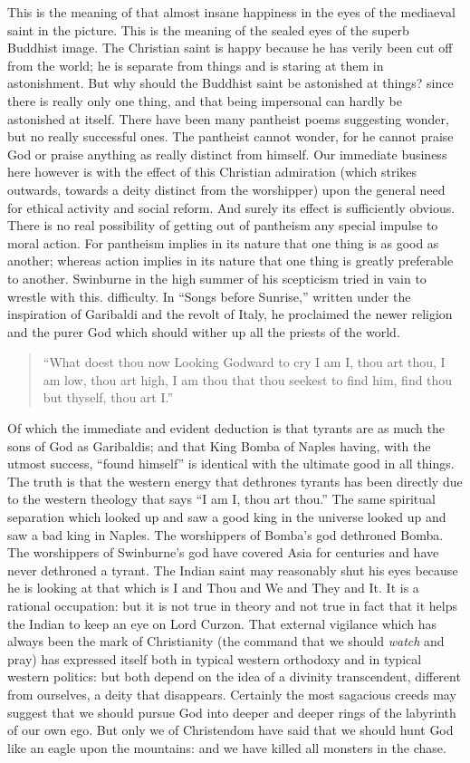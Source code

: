 \documentclass{book}
\newenvironment{mdblockquote}{%
  \begin{quotation}
    \itshape
}{%
  \end{quotation}
}
\begin{document}
This is the meaning of that almost insane happiness in the eyes of the mediaeval saint in the picture. This is the meaning of the sealed eyes of the superb Buddhist image. The Christian saint is happy because he has verily been cut off from the world; he is separate from things and is staring at them in astonishment. But why should the Buddhist saint be astonished at things? since there is really only one thing, and that being impersonal can hardly be astonished at itself. There have been many pantheist poems suggesting wonder, but no really successful ones. The pantheist cannot wonder, for he cannot praise God or praise anything as really distinct from himself. Our immediate business here however is with the effect of this Christian admiration (which strikes outwards, towards a deity distinct from the worshipper) upon the general need for ethical activity and social reform. And surely its effect is sufficiently obvious. There is no real possibility of getting out of pantheism any special impulse to moral action. For pantheism implies in its nature that one thing is as good as another; whereas action implies in its nature that one thing is greatly preferable to another. Swinburne in the high summer of his scepticism tried in vain to wrestle with this. difficulty. In “Songs before Sunrise,” written under the inspiration of Garibaldi and the revolt of Italy, he proclaimed the newer religion and the purer God which should wither up all the priests of the world.

\begin{mdblockquote}
“What doest thou now Looking Godward to cry I am I, thou art thou, I am low, thou art high, I am thou that thou seekest to find him, find thou but thyself, thou art I.”


\end{mdblockquote}
Of which the immediate and evident deduction is that tyrants are as much the sons of God as Garibaldis; and that King Bomba of Naples having, with the utmost success, “found himself” is identical with the ultimate good in all things. The truth is that the western energy that dethrones tyrants has been directly due to the western theology that says “I am I, thou art thou.” The same spiritual separation which looked up and saw a good king in the universe looked up and saw a bad king in Naples. The worshippers of Bomba’s god dethroned Bomba. The worshippers of Swinburne’s god have covered Asia for centuries and have never dethroned a tyrant. The Indian saint may reasonably shut his eyes because he is looking at that which is I and Thou and We and They and It. It is a rational occupation: but it is not true in theory and not true in fact that it helps the Indian to keep an eye on Lord Curzon. That external vigilance which has always been the mark of Christianity (the command that we should \emph{watch} and pray) has expressed itself both in typical western orthodoxy and in typical western politics: but both depend on the idea of a divinity transcendent, different from ourselves, a deity that disappears. Certainly the most sagacious creeds may suggest that we should pursue God into deeper and deeper rings of the labyrinth of our own ego. But only we of Christendom have said that we should hunt God like an eagle upon the mountains: and we have killed all monsters in the chase.
\end{document}
